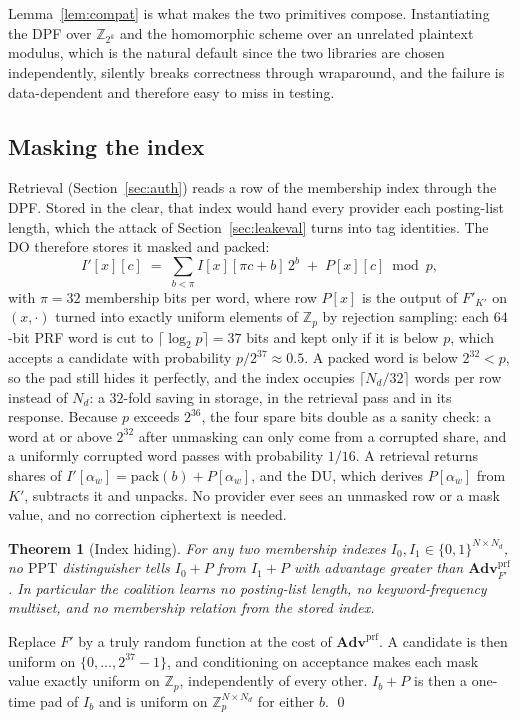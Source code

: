 \documentclass[a4paper,fleqn]{cas-sc}
\newtheorem{theorem}{Theorem}
\newcommand{\PPT}{\mathrm{PPT}}
\newcommand{\advPRF}{\mathbf{Adv}^{\mathrm{prf}}}
\begin{document}
Lemma~\ref{lem:compat} is what makes the two primitives compose. Instantiating
the DPF over $\mathbb{Z}_{2^k}$ and the homomorphic scheme over an unrelated
plaintext modulus, which is the natural default since the two libraries are
chosen independently, silently breaks correctness through wraparound, and the
failure is data-dependent and therefore easy to miss in testing.

\subsection{Masking the index}
\label{sec:mask}
Retrieval (Section~\ref{sec:auth}) reads a row of the membership index through
the DPF. Stored in the clear, that index would hand every provider each
posting-list length, which the attack of Section~\ref{sec:leakeval} turns into
tag identities. The DO therefore stores it masked and packed:
\[
I'[x][c]\;=\;\sum_{b<\pi} I[x][\pi c+b]\,2^b \;+\; P[x][c] \bmod p ,
\]
with $\pi=32$ membership bits per word, where row $P[x]$ is the output of
$F'_{K'}$ on $(x,\cdot)$ turned into exactly uniform elements of
$\mathbb{Z}_p$ by rejection sampling: each $64$-bit PRF word is cut to
$\lceil\log_2 p\rceil=37$ bits and kept only if it is below $p$, which accepts
a candidate with probability $p/2^{37}\approx0.5$. A packed word is below
$2^{32}<p$, so the pad still hides it perfectly, and the index occupies
$\lceil N_d/32\rceil$ words per row instead of $N_d$: a $32$-fold saving in
storage, in the retrieval pass and in its response. Because $p$ exceeds $2^{36}$,
the four spare bits double as a sanity check: a word at or above $2^{32}$ after
unmasking can only come from a corrupted share, and a uniformly corrupted word
passes with probability $1/16$. A retrieval returns shares of
$I'[\alpha_w]=\mathrm{pack}(b)+P[\alpha_w]$, and the DU, which derives
$P[\alpha_w]$ from $K'$, subtracts it and unpacks. No provider ever sees an
unmasked row or a mask value, and no correction ciphertext is needed.

\begin{theorem}[Index hiding]
\label{thm:mask}
For any two membership indexes $I_0,I_1\in\{0,1\}^{N\times N_d}$, no $\PPT$
distinguisher tells $I_0+P$ from $I_1+P$ with advantage greater than
$\advPRF_{F'}$. In particular the coalition learns no posting-list length, no
keyword-frequency multiset, and no membership relation from the stored index.
\end{theorem}
\begin{pf}
Replace $F'$ by a truly random function at the cost of $\advPRF$. A candidate
is then uniform on $\{0,\dots,2^{37}-1\}$, and conditioning on acceptance makes
each mask value exactly uniform on $\mathbb{Z}_p$, independently of every
other. $I_b+P$ is then a one-time pad of $I_b$ and is uniform on
$\mathbb{Z}_p^{N\times N_d}$ for either $b$. \qed
\end{pf}
\end{document}

